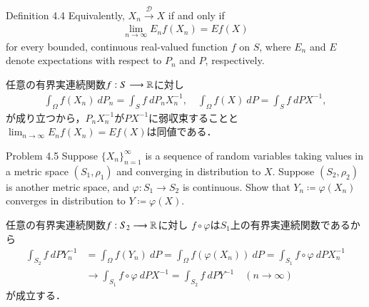 	\begin{itembox}[l]{Definition 4.4}
		Equivalently, $X_n \overset{\mathscr{D}}{\longrightarrow} X$ if and only if
		\begin{align}
			\lim_{n \to \infty} E_n f(X_n) = E f(X)
		\end{align} 
		for every bounded, continuous real-valued function $f$ on $S$, 
		where $E_n$ and $E$ denote expectations with respect to $P_n$ and $P$, respectively.
	\end{itembox}
	
	\begin{prf}
		任意の有界実連続関数$f:S \longrightarrow \mathbb{R}$に対し
		\begin{align}
			\int_\Omega f(X_n)\ dP_n = \int_S f\ dP_nX_n^{-1},
			\quad \int_\Omega f(X)\ dP = \int_S f\ dPX^{-1},
		\end{align}
		が成り立つから，$P_nX_n^{-1}$が$PX^{-1}$に弱収束することと
		$\lim_{n \to \infty} E_n f(X_n) = E f(X)$は同値である．
		\QED
	\end{prf}
	
	\begin{itembox}[l]{Problem 4.5}
		Suppose $\{X_n\}_{n=1}^\infty$ is a sequence of random variables taking values 
		in a metric space $(S_1,\rho_1)$ and converging in distribution to $X$. Suppose 
		$(S_2,\rho_2)$ is another metric space, and $\varphi:S_1 \longrightarrow S_2$ 
		is continuous. Show that $Y_n \coloneqq \varphi(X_n)$ converges in distribution 
		to $Y \coloneqq \varphi(X)$.
	\end{itembox}
	
	\begin{prf}
		任意の有界実連続関数$f:S_2 \longrightarrow \mathbb{R}$に対し
		$f \circ \varphi$は$S_1$上の有界実連続関数であるから
		\begin{align}
			\int_{S_2} f\ dPY_n^{-1}
			&= \int_{\Omega} f(Y_n)\ dP
			= \int_{\Omega} f(\varphi(X_n))\ dP
			= \int_{S_1} f \circ \varphi\ dPX_n^{-1} \\
			& \longrightarrow 
			\int_{S_1} f \circ \varphi\ dPX^{-1}
			= \int_{S_2} f\ dPY^{-1}
			\quad (n \longrightarrow \infty)
		\end{align}
		が成立する．
		\QED
	\end{prf}